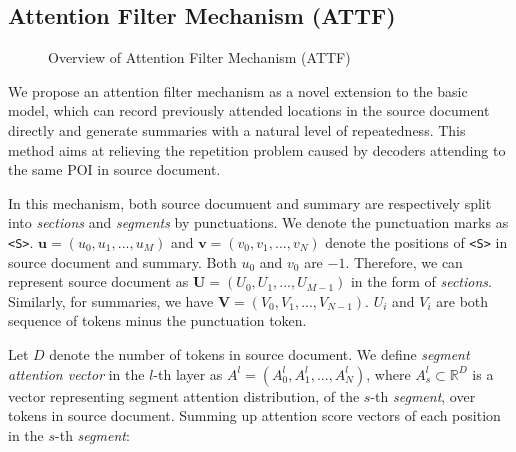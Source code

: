 \subsection{Attention Filter Mechanism (ATTF)}
\label{sec:attf}

\begin{figure}[th]
	\centering
	\caption{Overview of Attention Filter Mechanism (ATTF)}
	\label{fig:model_main}
\end{figure}


\label{sec:attnf}
We propose an attention filter mechanism as a novel extension 
to the basic model,
which can record previously attended locations 
in the source document directly and generate summaries 
with a natural level of repeatedness. 
This method aims at relieving the repetition problem caused by 
decoders attending to the same POI in source document.

In this mechanism, both source documuent and summary are 
respectively split into 
\textit{sections} and \textit{segments} by punctuations. We
denote the punctuation marks as \verb#<S>#.
$\mathbf{u}=(u_{0},u_{1},...,u_{M})$ 
and $\mathbf{v}=(v_{0},v_{1},...,v_{N})$
denote the positions of \verb#<S># in source document and summary.
Both $u_{0}$ and $v_{0}$ are $-1$.
Therefore, we can represent source document as $\mathbf{U}=(U_{0},U_{1},...,U_{M-1})$ in the form of \textit{sections}. Similarly, for summaries, we have $\mathbf{V}=(V_{0},V_{1},...,V_{N-1})$. 
$U_i$ and $V_i$ are
both sequence of tokens minus the punctuation token.

Let $D$ denote the number of tokens in source document.
We define \textit{segment attention vector} in the $l$-th layer as 
$A^{l} = (A_{0}^{l}, A_{1}^{l},..., A_{N}^{l})$, 
where $A_s^l\subset \mathbb{R}^{D}$ is a vector representing 
segment attention distribution, of the $s$-th \textit{segment},
over tokens in source document. Summing up attention score vectors 
of each position in the $s$-th \textit{segment}:

